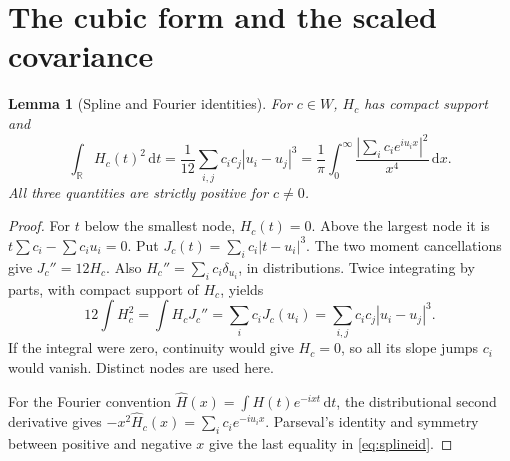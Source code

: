 \documentclass[11pt]{article}
\newtheorem{lemma}[theorem]{Lemma}
\theoremstyle{definition}\newtheorem{definition}[theorem]{Definition}
\theoremstyle{remark}\newtheorem{remark}[theorem]{Remark}
\newcommand{\R}{\mathbb R}
\newcommand{\dd}{\,\mathrm d}
\begin{document}
\section{The cubic form and the scaled covariance}\label{sec:cubic}
\begin{lemma}[Spline and Fourier identities]\label{lem:spline}
For $c\in W$, $H_c$ has compact support and
\begin{equation}\label{eq:splineid}
 \int_\R H_c(t)^2\dd t
 =\frac1{12}\sum_{i,j}c_ic_j|u_i-u_j|^3
 =\frac1\pi\int_0^\infty
       \frac{|\sum_i c_i e^{iu_i x}|^2}{x^4}\dd x.
\end{equation}
All three quantities are strictly positive for $c\ne0$.
\end{lemma}
\begin{proof}
For $t$ below the smallest node, $H_c(t)=0$. Above the largest node it
is $t\sum c_i-\sum c_i u_i=0$. Put
$J_c(t)=\sum_i c_i|t-u_i|^3$. The two moment cancellations give
$J_c''=12H_c$. Also $H_c''=\sum_i c_i\delta_{u_i}$, in distributions.
Twice integrating by parts, with compact support of $H_c$, yields
\[
 12\int H_c^2=\int H_c J_c''
   =\sum_i c_i J_c(u_i)
   =\sum_{i,j}c_ic_j|u_i-u_j|^3.
\]
If the integral were zero, continuity would give $H_c=0$, so all its
slope jumps $c_i$ would vanish. Distinct nodes are used here.

For the Fourier convention $\widehat H(x)=\int H(t)e^{-ixt}\dd t$,
the distributional second derivative gives
$-x^2\widehat H_c(x)=\sum_i c_i e^{-iu_i x}$.
Parseval's identity and symmetry between positive and negative $x$
give the last equality in \eqref{eq:splineid}.
\end{proof}
\end{document}
